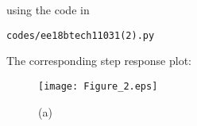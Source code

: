 \begin{enumerate}[label=\thesubsection.\arabic*.,ref=\thesubsection.\theenumi]
using the code in 
\begin{lstlisting}
codes/ee18btech11031(2).py
\end{lstlisting}

The corresponding step response plot: 
\begin{figure}[!h]
  \texttt{[image: Figure\_2.eps]}
  \caption{(a)}
  \label{fig:stepresponse}
\end{figure}
%

\end{enumerate}
